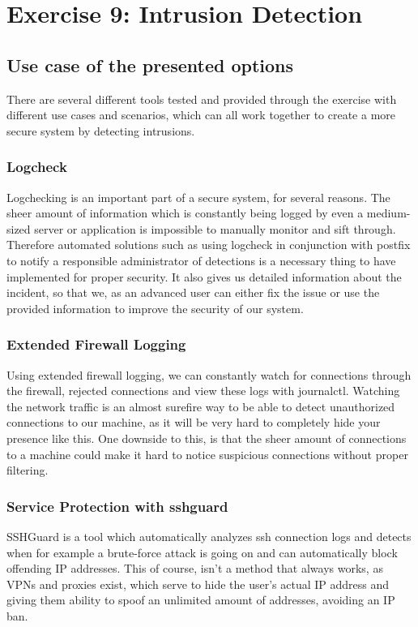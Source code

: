 \section{Exercise 9: Intrusion Detection}
\subsection{Use case of the presented options}
There are several different tools tested and provided through the exercise with different use cases and scenarios, which can all work together to create a more secure system by detecting intrusions.
\subsubsection{Logcheck}
Logchecking is an important part of a secure system, for several reasons. The sheer amount of information which is constantly being logged by even a medium-sized server or application is impossible to manually monitor and sift through. Therefore automated solutions such as using logcheck in conjunction with postfix to notify a responsible administrator of detections is a necessary thing to have implemented for proper security. It also gives us detailed information about the incident, so that we, as an advanced user can either fix the issue or use the provided information to improve the security of our system.

\subsubsection{Extended Firewall Logging}
Using extended firewall logging, we can constantly watch for connections through the firewall, rejected connections and view these logs with journalctl. Watching the network traffic is an almost surefire way to be able to detect unauthorized connections to our machine, as it will be very hard to completely hide your presence like this. One downside to this, is that the sheer amount of connections to a machine could make it hard to notice suspicious connections without proper filtering.

\subsubsection{Service Protection with sshguard}
SSHGuard is a tool which automatically analyzes ssh connection logs and detects when for example a brute-force attack is going on and can automatically block offending IP addresses. This of course, isn't a method that always works, as VPNs and proxies exist, which serve to hide the user's actual IP address and giving them ability to spoof an unlimited amount of addresses, avoiding an IP ban.

